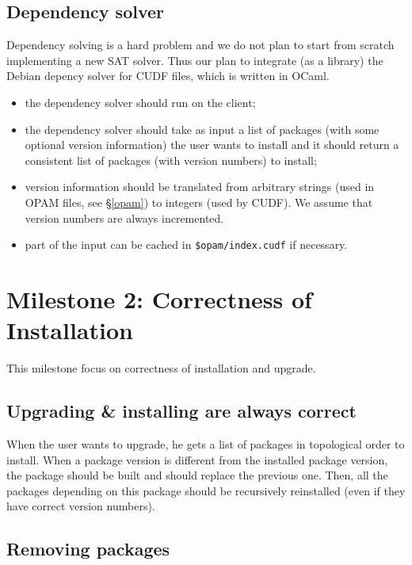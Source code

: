 \documentclass[a4paper,11pt]{article}
\begin{document}
\subsection{Dependency solver}
\label{deps}

Dependency solving is a hard problem and we do not plan to start from
scratch implementing a new SAT solver. Thus our plan to integrate (as
a library) the Debian depency solver for CUDF files, which is written
in OCaml.

\begin{itemize}
\item the dependency solver should run on the client;
\item the dependency solver should take as input a list of packages
  (with some optional version information) the user wants to install
  and it should return a consistent list of packages (with version
  numbers) to install;
\item version information should be translated from arbitrary strings
  (used in OPAM files, see \S\ref{opam}) to integers (used by
  CUDF). We assume that version numbers are always incremented.
\item part of the input can be cached in {\tt \$opam/index.cudf}
  if necessary.
\end{itemize}

\section{Milestone 2: Correctness of Installation}

This milestone focus on correctness of installation and upgrade.

\subsection{Upgrading \& installing are always correct}

When the user wants to upgrade, he gets a list of packages in
topological order to install. When a package version is different from
the installed package version, the package should be built and should
replace the previous one. Then, all the packages depending on this
package should be recursively reinstalled (even if they have correct
version numbers).

\subsection{Removing packages}
\end{document}
